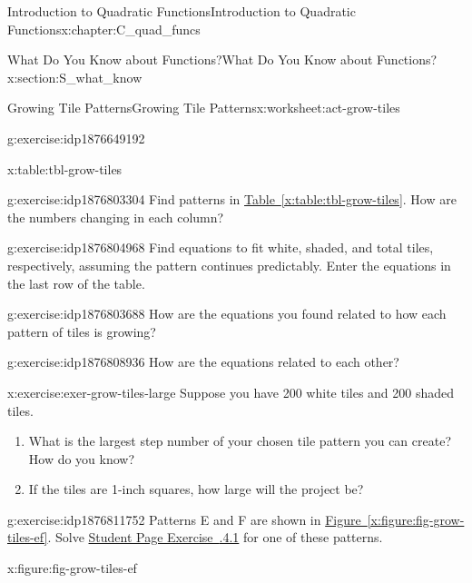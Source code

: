 \documentclass[oneside,10pt,]{book}
\newcommand{\xreffont}{\relax}
\numberwithin{equation}{chapter}
\begin{document}
\begin{chapterptx}{Introduction to Quadratic Functions}{}{Introduction to Quadratic Functions}{}{}{x:chapter:C_quad_funcs}
\begin{sectionptx}{What Do You Know about Functions?}{}{What Do You Know about Functions?}{}{}{x:section:S_what_know}
\begin{worksheet-subsection}{Growing Tile Patterns}{}{Growing Tile Patterns}{}{}{x:worksheet:act-grow-tiles}
\begin{divisionexercise}{2}{}{}{g:exercise:idp1876649192}
\begin{tableptx}{\textbf{}}{x:table:tbl-grow-tiles}{}
{}%
\end{tableptx}%
\end{divisionexercise}%
\begin{divisionexercise}{3}{}{}{g:exercise:idp1876803304}%
Find patterns in \hyperref[x:table:tbl-grow-tiles]{Table~{\xreffont\ref{x:table:tbl-grow-tiles}}}. How are the numbers changing in each column?%
\end{divisionexercise}%
\begin{divisionexercise}{4}{}{}{g:exercise:idp1876804968}%
Find equations to fit white, shaded, and total tiles, respectively, assuming the pattern continues predictably. Enter the equations in the last row of the table.%
\end{divisionexercise}%
\begin{divisionexercise}{5}{}{}{g:exercise:idp1876803688}%
How are the equations you found related to how each pattern of tiles is growing?%
\end{divisionexercise}%
\begin{divisionexercise}{6}{}{}{g:exercise:idp1876808936}%
How are the equations related to each other?%
\end{divisionexercise}%
\begin{divisionexercise}{7}{}{}{x:exercise:exer-grow-tiles-large}%
Suppose you have 200 white tiles and 200 shaded tiles.%
\begin{enumerate}[font=\bfseries,label=(\alph*),ref=\alph*]
\item{}What is the largest step number of your chosen tile pattern you can create? How do you know?%
\item{}If the tiles are 1-inch squares, how large will the project be?%
\end{enumerate}
\end{divisionexercise}%
\begin{divisionexercise}{8}{}{}{g:exercise:idp1876811752}%
Patterns E and F are shown in \hyperref[x:figure:fig-grow-tiles-ef]{Figure~{\xreffont\ref{x:figure:fig-grow-tiles-ef}}}. Solve \hyperlink{x:exercise:exer-grow-tiles-study}{Student Page Exercise~{\xreffont 4.6.4.1}\textendash{}{\xreffont 4.6.4.7}} for one of these patterns.%
\begin{figureptx}{}{x:figure:fig-grow-tiles-ef}{}%
\begin{image}{0.05}{0.9}{0.05}%

\end{image}
\end{figureptx}
\end{divisionexercise}
\end{worksheet-subsection}
\end{sectionptx}
\end{chapterptx}
\end{document}
